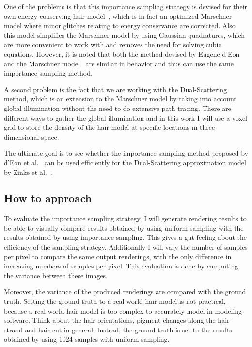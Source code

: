 \documentclass[11pt,a4paper]{report}
\begin{document}
One of the problems is that this importance sampling strategy is devised for their own energy conserving hair model~\cite{eon2011}, which is in fact an optimized Marschner model where minor glitches relating to energy conservance are corrected. Also this model simplifies the Marschner model by using Gaussian quadratures, which are more convenient to work with and removes the need for solving cubic equations. However, it is noted that both the method devised by Eugene d'Eon~\cite{eon2011} and the Marschner model~\cite{marschner} are similar in behavior and thus can use the same importance sampling method.

A second problem is the fact that we are working with the Dual-Scattering method, which is an extension to the Marschner model by taking into account global illumination without the need to do extensive path tracing. There are different ways to gather the global illumination and in this work I will use a voxel grid to store the density of the hair model at specific locations in three-dimensional space.

The ultimate goal is to see whether the importance sampling method proposed by d'Eon et al.~\cite{eon2013} can be used efficiently for the Dual-Scattering approximation model by Zinke et al.~\cite{zinke}.

\subsection{How to approach}

To evaluate the importance sampling strategy, I will generate rendering results to be able to visually compare results obtained by using uniform sampling with the results obtained by using importance sampling. This gives a gut feeling about the efficiency of the sampling strategy. Additionally I will vary the number of samples per pixel to compare the same output renderings, with the only difference in increasing numbers of samples per pixel. This evaluation is done by computing the variance between these images.

Moreover, the variance of the produced renderings are compared with the ground truth. Setting the ground truth to a real-world hair model is not practical, because a real world hair model is too complex to accurately model in modeling software. Think about the hair orientations, pigment changes along the hair strand and hair cut in general. Instead, the ground truth is set to the results obtained by using 1024 samples with uniform sampling.\\
\end{document}
